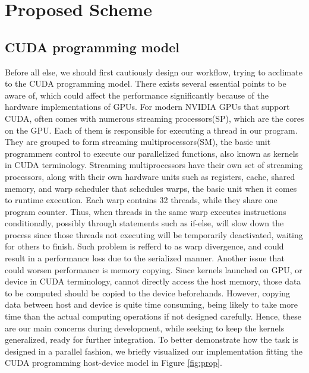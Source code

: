\documentclass{PHlab-thesis}
\begin{document}
\section{Proposed Scheme}
\subsection{CUDA programming model}
Before all else, we should first cautiously design our workflow, trying to acclimate to the CUDA programming model. There exists several essential points to be aware of, which could affect the performance significantly because of the hardware implementations of GPUs. For modern NVIDIA GPUs that support CUDA, often comes with numerous streaming processors(SP), which are the cores on the GPU. Each of them is responsible for executing a thread in our program. They are grouped to form streaming multiprocessors(SM), the basic unit programmers control to execute our parallelized functions, also known as kernels in CUDA terminology. Streaming multiprocessors have their own set of streaming processors, along with their own hardware units such as registers, cache, shared memory, and warp scheduler that schedules warps, the basic unit when it comes to runtime execution. Each warp contains 32 threads, while they share one program counter. Thus, when threads in the same warp executes instructions conditionally, possibly through statements such as if-else, will slow down the process since those threads not executing will be temporarily deactivated, waiting for others to finish. Such problem is refferd to as warp divergence, and could result in a performance loss due to the serialized manner. Another issue that could worsen performance is memory copying. Since kernels launched on GPU, or device in CUDA terminology, cannot directly access the host memory, those data to be computed should be copied to the device beforehands. However, copying data between host and device is quite time consuming, being likely to take more time than the actual computing operations if not designed carefully. Hence, these are our main concerns during development, while seeking to keep the kernels generalized, ready for further integration. To better demonstrate how the task is designed in a parallel fashion, we briefly visualized our implementation fitting the CUDA programming host-device model in Figure \ref{fig:prop}. 
\end{document}
